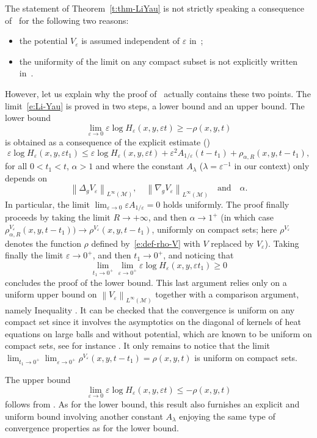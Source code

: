 \documentclass[10pt]{amsart}
\theoremstyle{definition}
\newcommand{\M}{\ensuremath{\mathcal M}}
\newcommand\nor[2]{\left\|#1\right\|_{#2}}
\let\e\varepsilon
\let\eps\varepsilon
\begin{document}
The statement of Theorem~\ref{t:thm-LiYau} is not strictly speaking a consequence of~\cite[Th.\,6.1]{LY86} for the following two reasons:
\begin{itemize}
\item the potential $V_\eps$ is assumed independent of $\eps$ in~\cite{LY86};
\item the uniformity of the limit on any compact subset is not explicitly written in~\cite{LY86}.
\end{itemize}
However, let us explain why the proof of~\cite[Th.\,6.1]{LY86} actually contains these two points.
The limit~\eqref{e:Li-Yau} is proved in two steps, a lower bound and an upper bound.
The lower bound
\[
\underset{\e\to 0}{\lim}\e \log H_{\e}(x,y,\e t) \geq -\rho(x,y,t)
\]
is obtained as a consequence of the explicit estimate (\cite[Th.\,2.1]{LY86})
\[
\e \log H_{\e}(x,y,\e t_1) \leq \e \log H_{\e}(x,y,\e t)
+ \eps^2 A_{1/\eps} (t-t_1) + \rho_{\alpha,R}(x,y,t-t_1),
\]
for all $0<t_1<t$, $\alpha>1$ and
where the constant $A_{\lambda}$ ($\lambda=\e^{-1}$ in our context) only depends on
\[
\nor{\Delta_g V_\eps}{L^\infty(\M)},\quad \nor{\nabla_g V_\eps}{L^\infty(\M)}\quad\text{and}\quad\alpha.
\]
In particular, the limit $\lim_{\eps\to 0} \eps A_{1/\eps} = 0$ holds uniformly.
The proof finally proceeds by taking the limit $R\to + \infty$, and then $\alpha \to 1^+$ (in which case $\rho^{V_\eps}_{\alpha,R}(x,y,t-t_1)) \to \rho^{V_\eps}(x,y,t-t_1)$, uniformly on compact sets; here $\rho^{V_\eps}$ denotes the function $\rho$ defined by~\eqref{e:def-rho-V} with $V$ replaced by $V_\eps$). Taking finally the limit $\eps \to 0^+$, and then $t_1 \to 0^+$, and noticing that\enlargethispage{-\baselineskip}
\[
\lim_{t_1\to 0^+}\lim_{\eps \to 0^+} \e \log H_{\e}(x,y,\e t_1) \geq 0
\]
concludes the proof of the lower bound.
This last argument relies only on a uniform upper bound on $\nor{V_\eps}{L^\infty(\M)}$ together with a comparison argument, namely Inequa\-lity \cite[(6.3)]{LY86}. It can be checked that the convergence is uniform on any compact set since it involves the asymptotics on the diagonal of kernels of heat equations on large balls and without potential, which are known to be uniform on compact sets, see for instance \cite[Th.\,4.6]{Va:67b}.
It only remains to notice that the limit $\lim_{t_1\to 0^+} \lim_{\eps \to 0^+} \rho^{V_\eps}(x,y,t-t_1) = \rho(x,y, t)$ is uniform on compact sets.

The upper bound
\[
\underset{\e\to 0}{\lim}\e \log H_{\e}(x,y,\e t) \leq -\rho(x,y,t)
\]
follows from \cite[Th.\,3.3]{LY86}. As for the lower bound, this result also furnishes an explicit and uniform bound involving another constant $A_{\lambda}$ enjoying the same type of convergence properties as for the lower bound.
\end{document}

